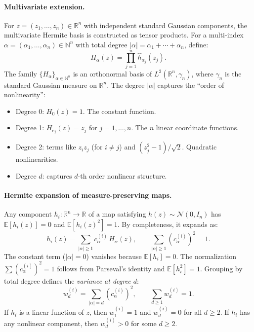 \paragraph{Multivariate extension.}
For $z = (z_1, \ldots, z_n) \in \mathbb{R}^n$ with independent standard Gaussian components, the multivariate Hermite basis is constructed as tensor products.
For a multi-index $\alpha = (\alpha_1, \ldots, \alpha_n) \in \mathbb{N}^n$ with total degree $|\alpha| = \alpha_1 + \cdots + \alpha_n$, define:
\begin{equation}
    H_\alpha(z) = \prod_{j=1}^n \hat{h}_{\alpha_j}(z_j).
\end{equation}
The family $\{H_\alpha\}_{\alpha \in \mathbb{N}^n}$ is an orthonormal basis of $L^2(\mathbb{R}^n, \gamma_n)$, where $\gamma_n$ is the standard Gaussian measure on $\mathbb{R}^n$.
The degree $|\alpha|$ captures the ``order of nonlinearity'':
\begin{itemize}
    \item Degree 0: $H_0(z) = 1$. The constant function.
    \item Degree 1: $H_{e_j}(z) = z_j$ for $j = 1, \ldots, n$. The $n$ linear coordinate functions.
    \item Degree 2: terms like $z_iz_j$ (for $i \neq j$) and $(z_j^2 - 1)/\sqrt{2}$. Quadratic nonlinearities.
    \item Degree $d$: captures $d$-th order nonlinear structure. %
\end{itemize}

\paragraph{Hermite expansion of measure-preserving maps.}
Any component $h_i: \mathbb{R}^n \to \mathbb{R}$ of a map satisfying $h(z) \sim \mathcal{N}(0, I_n)$ has $\mathbb{E}[h_i(z)] = 0$ and $\mathbb{E}[h_i(z)^2] = 1$.
By completeness, it expands as:
\begin{equation}\label{eq:app-hermite-expand}
    h_i(z) = \sum_{|\alpha| \geq 1} c_\alpha^{(i)}\, H_\alpha(z), \qquad \sum_{|\alpha| \geq 1} (c_\alpha^{(i)})^2 = 1.
\end{equation}
The constant term ($|\alpha| = 0$) vanishes because $\mathbb{E}[h_i] = 0$.
The normalization $\sum (c_\alpha^{(i)})^2 = 1$ follows from Parseval's identity and $\mathbb{E}[h_i^2] = 1$.
Grouping by total degree defines the \emph{variance at degree $d$}:
\begin{equation}
    w_d^{(i)} = \sum_{|\alpha|=d} (c_\alpha^{(i)})^2, \qquad \sum_{d \geq 1} w_d^{(i)} = 1.
\end{equation}
If $h_i$ is a linear function of $z$, then $w_1^{(i)} = 1$ and $w_d^{(i)} = 0$ for all $d \geq 2$.
If $h_i$ has any nonlinear component, then $w_d^{(i)} > 0$ for some $d \geq 2$.



